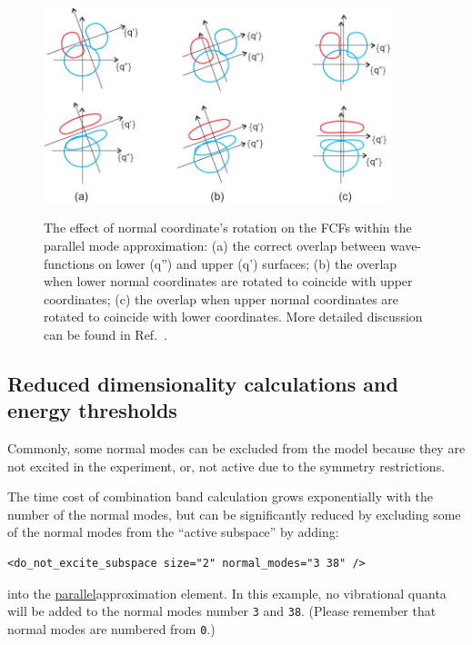 \documentclass[11pt]{article}
\begin{document}
\begin{figure}[h!]
  \centering
  \caption{The effect of normal coordinate's rotation on the FCFs within the parallel mode
approximation: (a) the correct overlap between wave-functions on lower (q'') and upper (q') surfaces;
(b) the overlap when lower normal coordinates are rotated to coincide with upper coordinates;
(c) the overlap when upper normal coordinates are rotated to coincide with lower coordinates. 
More detailed discussion can be found in Ref.~\cite{Koziol:HCOH:2009}.}
  \includegraphics[width=0.9\textwidth]{nm_rotations.pdf}
  \label{fig:rotations}
\end{figure}


\subsection{Reduced dimensionality calculations and energy thresholds}
\label{sec:para:subspace}

Commonly, some normal modes can be excluded from the model because they are not excited in the experiment,
or, not active due to the symmetry restrictions. 

The time cost of combination band calculation grows exponentially with the number of the normal modes, 
but can be significantly reduced by excluding some of the normal modes from the ``active subspace'' 
by adding:
\begin{lstlisting}[frame=single,framerule=0pt]
   <do_not_excite_subspace size="2" normal_modes="3 38" />
\end{lstlisting}
into the \ul{parallel}{approximation} element. In this example, no vibrational quanta will be added to 
the normal modes number {\tt 3} and {\tt 38}. (Please remember that normal modes are numbered from {\tt 0}.)
\end{document}
